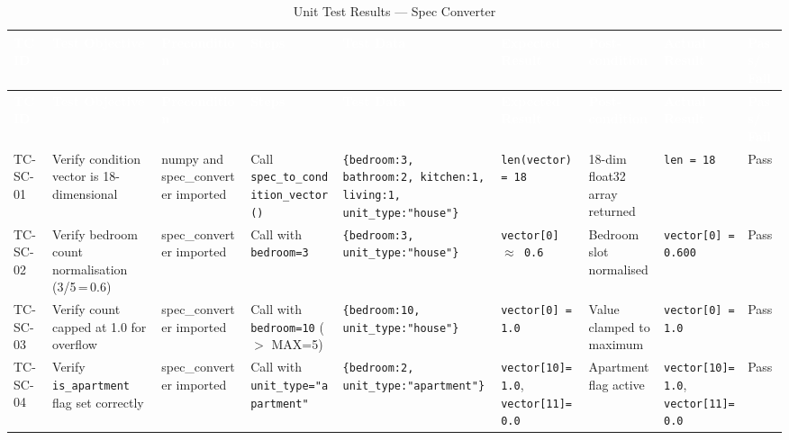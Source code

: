 \begin{landscape}
\small
\begin{longtable}{|p{1.4cm}|p{3.2cm}|p{2.8cm}|p{2.8cm}|p{2.8cm}|p{2.8cm}|p{2.6cm}|p{2.8cm}|p{1.0cm}|}
\caption{Unit Test Results — Spec Converter} \label{tab:sc} \\
\hline
\rowcolor{tableheader}
\textcolor{white}{\textbf{TC ID}} &
\textcolor{white}{\textbf{Test Objective}} &
\textcolor{white}{\textbf{Precondition}} &
\textcolor{white}{\textbf{Steps}} &
\textcolor{white}{\textbf{Test Data}} &
\textcolor{white}{\textbf{Expected Result}} &
\textcolor{white}{\textbf{Post-condition}} &
\textcolor{white}{\textbf{Actual Result}} &
\textcolor{white}{\textbf{Pass/ Fail}} \\
\hline
\endfirsthead
\hline
\rowcolor{tableheader}
\textcolor{white}{\textbf{TC ID}} &
\textcolor{white}{\textbf{Test Objective}} &
\textcolor{white}{\textbf{Precondition}} &
\textcolor{white}{\textbf{Steps}} &
\textcolor{white}{\textbf{Test Data}} &
\textcolor{white}{\textbf{Expected Result}} &
\textcolor{white}{\textbf{Post-condition}} &
\textcolor{white}{\textbf{Actual Result}} &
\textcolor{white}{\textbf{Pass/ Fail}} \\
\hline
\endhead

\rowcolor{passgreen}
TC-SC-01 & Verify condition vector is 18-dimensional & numpy and spec\_converter imported & Call \texttt{spec\_to\_condition\_vector()} & \texttt{\{bedroom:3, bathroom:2, kitchen:1, living:1, unit\_type:"house"\}} & \texttt{len(vector) = 18} & 18-dim float32 array returned & \texttt{len = 18} & Pass \\ \hline

\rowcolor{passgreen}
TC-SC-02 & Verify bedroom count normalisation (3/5\,=\,0.6) & spec\_converter imported & Call with \texttt{bedroom=3} & \texttt{\{bedroom:3, unit\_type:"house"\}} & \texttt{vector[0] $\approx$ 0.6} & Bedroom slot normalised & \texttt{vector[0] = 0.600} & Pass \\ \hline

\rowcolor{passgreen}
TC-SC-03 & Verify count capped at 1.0 for overflow & spec\_converter imported & Call with \texttt{bedroom=10} ($>$ MAX=5) & \texttt{\{bedroom:10, unit\_type:"house"\}} & \texttt{vector[0] = 1.0} & Value clamped to maximum & \texttt{vector[0] = 1.0} & Pass \\ \hline

\rowcolor{passgreen}
TC-SC-04 & Verify \texttt{is\_apartment} flag set correctly & spec\_converter imported & Call with \texttt{unit\_type="apartment"} & \texttt{\{bedroom:2, unit\_type:"apartment"\}} & \texttt{vector[10]=1.0}, \texttt{vector[11]=0.0} & Apartment flag active & \texttt{vector[10]=1.0}, \texttt{vector[11]=0.0} & Pass \\ \hline


\end{longtable}
\end{landscape}
